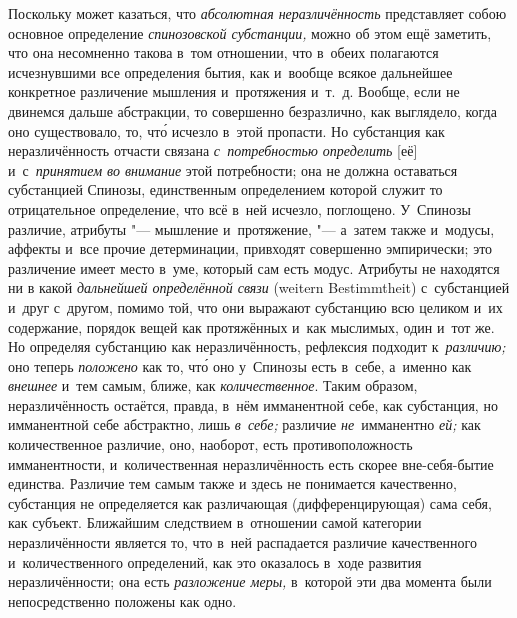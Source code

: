 Поскольку может казаться, что {\em абсолютная неразличённость} представляет
собою основное определение {\em спинозовской субстанции,} можно об этом ещё
заметить, что она несомненно такова в~том отношении, что в~обеих полагаются
исчезнувшими все определения бытия, как и~вообще всякое дальнейшее конкретное
различение мышления и~протяжения и~т.~д. Вообще, если не двинемся дальше
абстракции, то совершенно безразлично, как выглядело, когда оно существовало,
то, чт\'{о} исчезло в~этой пропасти. Но субстанция как неразличённость отчасти
связана {\em с~потребностью определить} [её] и~с~{\em принятием во внимание}
этой потребности; она не должна оставаться субстанцией Спинозы, единственным
определением которой служит то отрицательное определение, что всё в~ней
исчезло, поглощено. У~Спинозы
различие, атрибуты "--- мышление и~протяжение, "--- а~затем также и~модусы,
аффекты и~все прочие детерминации, привходят совершенно эмпирически; это
различение имеет место в~уме, который сам есть модус. Атрибуты не находятся ни
в какой {\em дальнейшей определённой связи} (wei\-tern Be\-stimmt\-heit)
с~субстанцией и~друг с~другом, помимо той, что они выражают субстанцию всю
целиком и~их содержание, порядок вещей как протяжённых и~как мыслимых, один
и~тот же. Но определяя субстанцию как неразличённость, рефлексия подходит
к~{\em различию;} оно теперь {\em положено} как то, чт\'{о} оно у~Спинозы есть
в~себе, а~именно как {\em внешнее} и~тем самым, ближе, как
{\em количественное}. Таким образом, неразличённость остаётся, правда, в~нём
имманентной себе, как субстанция, но имманентной себе абстрактно, лишь
{\em в~себе;} различие {\em не}~имманентно {\em ей;} как количественное
различие, оно, наоборот, есть противоположность имманентности, и~количественная
неразличённость есть скорее вне-себя-бытие единства. Различие тем самым также и
здесь не понимается качественно, субстанция не определяется как различающая
(дифференцирующая) сама себя, как субъект. Ближайшим следствием в~отношении
самой категории неразличённости является то, что в~ней распадается различие
качественного и~количественного определений, как это оказалось в~ходе развития
неразличённости; она есть {\em разложение меры,} в~которой эти два момента были
непосредственно положены как одно.

